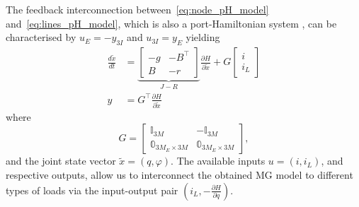 \documentclass[journal, final, letterpaper]{IEEEtran}
\newcommand{\diff}[2]{{\frac{d #1}{d #2}}}
\newcommand{\pdiff}[2]{{\frac{\partial #1}{\partial #2}}}
\newcommand{\mbb}{\mathbb}
\begin{document}
%
The feedback interconnection between~\eqref{eq:node_pH_model} and~\eqref{eq:lines_pH_model}, which is also a port-Hamiltonian system \cite{Cervera2007a}, can be characterised by $u_E = - y_{3I}$ and $u_{3I} = y_E$ yielding
%
\begin{subequations}
\begin{align}
  \diff{\tilde{x}}{t} & = \underbrace{\begin{bmatrix}-g & -B^\top\\ B & -r \end{bmatrix}}_{J-R} \pdiff{H}{\tilde{x}} + G\begin{bmatrix} i\\i_L\end{bmatrix} \\
   y &= G^\top \pdiff{H}{\tilde{x}}
\end{align}
\label{eq:line_node_interconnection}	
\end{subequations}
%
where 
\[
G = \begin{bmatrix}\mbb{I}_{3M} & -\mbb{I}_{3M}\\\mbb{0}_{3M_E \times 3M } & \mbb{0}_{3M_E \times 3M} \end{bmatrix},
\]
and the joint state vector $\tilde{x} = (q,\varphi)$. The available inputs $u= (i,i_L)$, and respective outputs, allow us to interconnect the obtained \ac{MG} model to different types of loads via the input-output pair $(i_L,-\pdiff{H}{q})$. 
\end{document}
